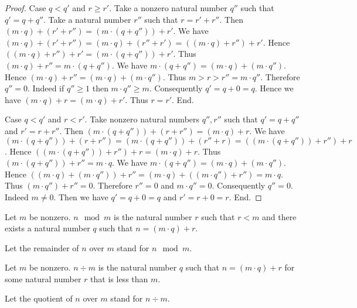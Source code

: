 \documentclass[../../natural-numbers.ftl.tex]{subfiles}
\begin{document}
\begin{forthel}
\begin{proof}
      Case $q < q'$ and $r \geq r'$.
        Take a nonzero natural number $q''$ such that $q' = q + q''$.
        Take a natural number $r''$ such that $r = r' + r''$.
        Then $(m \cdot q) + (r' + r'') = (m \cdot (q + q'')) + r'$.
        We have $(m \cdot q) + (r' + r'') = (m \cdot q) + (r'' + r') = ((m \cdot q) + r'') + r'$.
        Hence $((m \cdot q) + r'') + r' = (m \cdot (q + q'')) + r'$.
        Thus $(m \cdot q) + r'' = m \cdot (q + q'')$.
        We have $m \cdot (q + q'') = (m \cdot q) + (m \cdot q'')$.
        Hence $(m \cdot q) + r'' = (m \cdot q) + (m \cdot q'')$.
        Thus $m > r > r'' = m \cdot q''$.
        Therefore $q'' = 0$.
        Indeed if $q'' \geq 1$ then $m \cdot q'' \geq m$.
        Consequently $q' = q + 0 = q$.
        Hence we have $(m \cdot q) + r = (m \cdot q) + r'$.
        Thus $r = r'$.
      End.

      Case $q < q'$ and $r < r'$.
        Take nonzero natural numbers $q'',r''$ such that $q' = q + q''$ and $r' = r + r''$.
        Then $(m \cdot (q + q'')) + (r + r'') = (m \cdot q) + r$.
        We have $(m \cdot (q + q'')) + (r + r'') = (m \cdot (q + q'')) + (r'' + r) = ((m \cdot (q + q'')) + r'') + r$.
        Hence $((m \cdot (q + q'')) + r'') + r = (m \cdot q) + r$.
        Thus $(m \cdot (q + q'')) + r'' = m \cdot q$.
        We have $m \cdot (q + q'') = (m \cdot q) + (m \cdot q'')$.
        Hence $((m \cdot q) + (m \cdot q'')) + r'' = (m \cdot q) + ((m \cdot q'') + r'') = m \cdot q$.
        Thus $(m \cdot q'') + r'' = 0$.
        Therefore $r'' = 0$ and $m \cdot q'' = 0$.
        Consequently $q'' = 0$.
        Indeed $m \neq 0$.
        Then we have $q' = q + 0 = q$  and $r' = r + 0 = r$.
      End.
    \end{proof}

    \begin{definition}
      Let $m$ be nonzero.
      $n \mod m$ is the natural number $r$ such that $r < m$ and there exists a natural number $q$ such that $n = (m \cdot q) + r$.
    \end{definition}

    Let the remainder of $n$ over $m$ stand for $n \mod m$.

    \begin{definition}
      Let $m$ be nonzero.
      $n \div m$ is the natural number $q$ such that $n = (m \cdot q) + r$ for some natural number $r$ that is less than $m$.
    \end{definition}

    Let the quotient of $n$ over $m$ stand for $n \div m$.
  \end{forthel}
\end{document}
